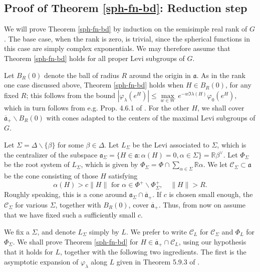 \documentclass[12pt]{amsart}
\theoremstyle{remark}
\newcommand{\R}{\mathbb R}
\newcommand{\ga}{\mathfrak a}
\newcommand{\be}{\begin{equation}}
\newcommand{\ee}{\end{equation}}
\begin{document}
\subsection{Proof of Theorem \ref{sph-fn-bd}: Reduction step}

We will prove Theorem \ref{sph-fn-bd} by induction on the semisimple real rank of $G$.  The base case, when the rank is zero, is trivial, since the spherical functions in this case are simply complex exponentials. We may therefore assume that Theorem \ref{sph-fn-bd} holds for all proper Levi subgroups of $G$.

Let $B_R(0)$ denote the ball of radius $R$ around the origin in $\ga$.  As in the rank one case discussed above, Theorem \ref{sph-fn-bd} holds when $H \in B_R(0)$, for any fixed $R$; this follows from the bound $| \varphi_\lambda(e^H)| \le \underset{w \in W}{\max} \, e^{-w \Im \lambda(H) } \varphi_0(e^H)$, which in turn follows from e.g. Prop. 4.6.1 of \cite{Gangolli_Varadarajan_88}.  For the other $H$, we shall cover $\overline{\ga}_+ \smallsetminus B_R(0)$ with cones adapted to the centers of the maximal Levi subgroups of $G$.

Let $\Sigma = \Delta \smallsetminus \{\beta \}$ for some $\beta\in \Delta$.  Let $L_\Sigma$ be the Levi associated to $\Sigma$, which is the centralizer of the subspace $\ga_\Sigma = \{ H \in \ga : \alpha(H) = 0, \alpha \in \Sigma \} = \mathbb{R} \beta^\vee$.  Let $\Phi_\Sigma$ be the root system of $L_\Sigma$, which is given by $\Phi_\Sigma = \Phi \cap \sum_{\alpha \in \Sigma} \R \alpha$.  We let $\mathcal{C}_\Sigma \subset \ga$ be the cone consisting of those $H$ satisfying
\be
\label{CLdef}
\alpha(H) > c \| H \| \text{ for } \alpha \in \Phi^+ \smallsetminus \Phi_\Sigma^+, \quad \| H \| > R.
\ee
Roughly speaking, this is a cone around $\ga_\Sigma \cap \overline{\ga}_+$.  If $c$ is chosen small enough, the $\mathcal{C}_\Sigma$ for various $\Sigma$, together with $B_R(0)$, cover $\overline{\ga}_+$. Thus, from now on assume that we have fixed such a sufficiently small $c$.

We fix a $\Sigma$, and denote $L_\Sigma$ simply by $L$. We prefer to write $\mathcal{C}_L$ for $\mathcal{C}_\Sigma$ and $\Phi_L$ for $\Phi_\Sigma$.  We shall prove Theorem \ref{sph-fn-bd} for $H \in \overline{\ga}_+ \cap \mathcal{C}_{L}$, using our hypothesis that it holds for $L$, together with the following two ingredients.  The first is the asymptotic expansion of $\varphi_\lambda$ along $L$ given in Theorem 5.9.3 of \cite{Gangolli_Varadarajan_88}.
\end{document}
